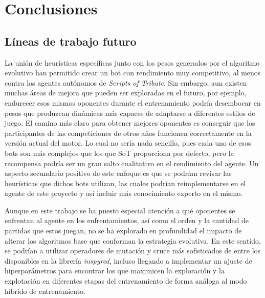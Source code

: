 \chapter{Conclusiones} \label{chap:conclusiones}




\section{Líneas de trabajo futuro} \label{sec:trabajo_futuro}

La unión de heurísticas específicas junto con los pesos generados por el algoritmo evolutivo han permitido crear un bot con rendimiento muy competitivo, al menos contra los agentes autónomos de \textit{Scripts of Tribute}. Sin embargo, aun existen muchas áreas de mejora que pueden ser exploradas en el futuro, por ejemplo, endurecer esos mismos oponentes durante el entrenamiento podría desembocar en pesos que produzcan dinámicas más capaces de adaptarse a diferentes estilos de juego. El camino más claro para obtener mejores oponentes es conseguir que los participantes de las competiciones de otros años funcionen correctamente en la versión actual del motor. Lo cual no sería nada sencillo, pues cada uno de esos bots son más complejos que los que SoT proporciona por defecto, pero la recompensa podría ser un gran salto cualitativo en el rendimiento del agente. Un aspecto secundario positivo de este enfoque es que se podrían revisar las heurísticas que dichos bots utilizan, las cuales podrían reimplementarse en el agente de este proyecto y así incluir más conocimiento experto en el mismo.

Aunque en este trabajo se ha puesto especial atención a qué oponentes se enfrentan al agente en los enfrentamientos, así como el orden y la cantidad de partidas que estos juegan, no se ha explorado en profundidad el impacto de alterar los algoritmos base que conforman la estrategia evolutiva. En este sentido, se podrían a utilizar operadores de mutación y cruce más sofisticados de entre los disponibles en la librería \textit{inspyred}, incluso llegando a implementar un ajuste de hiperparámetros para encontrar los que maximicen la exploración y la explotación en diferentes etapas del entrenamiento de forma análoga al modo híbrido de entrenamiento.

